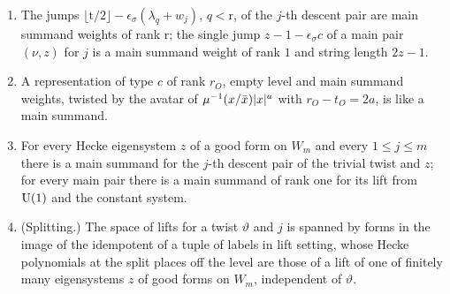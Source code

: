 \begin{theorem}\label{thm:main-summands-exist}
\begin{enumerate}[label=\textup{(\alph*)}]
\item The jumps $\lfloor\mathrm t/2\rfloor-\epsilon_\sigma(\lambda_q+w_j)$, $q<\mathrm r$, of the $j$-th descent pair are main summand weights of rank $\mathrm r$; the single jump $z-1-\epsilon_\sigma c$ of a main pair $(\nu,z)$ for $j$ is a main
summand weight of rank $1$ and string length $2z-1$.
\item A representation of type $c$ of rank $r_O$, empty level and main summand weights, twisted by the avatar of $\mu^{-1}(x/\bar x)\lvert x\rvert^{a}$ with $r_O-t_O=2a$, is like a main summand.
\item For every Hecke eigensystem $z$ of a good form on $W_m$ and every $1\le j\le m$ there is a main summand for the $j$-th descent pair of the trivial twist and $z$; for every main pair there is a main summand of
rank one for its lift from $\operatorname{U}(1)$ and the constant system.
\item (Splitting.) The space of lifts for a twist $\vartheta$ and $j$ is spanned by forms in the image of the idempotent of a tuple of labels in lift setting, whose Hecke polynomials at the split places off the level
are those of a lift of one of finitely many eigensystems $z$ of good forms on $W_m$, independent of $\vartheta$.
\end{enumerate}
\end{theorem}

